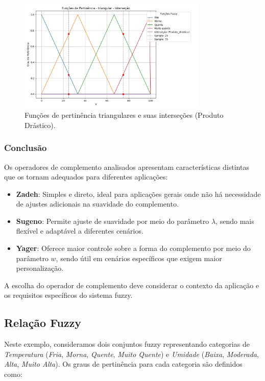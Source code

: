 \documentclass[a4paper,12pt]{article}
\begin{document}
\begin{figure}[H]
    \centering
    \includegraphics[width=0.8\textwidth]{img/funções_de_pertinência_triangular_interseção_fuzzificado.png}
    \caption{Funções de pertinência triangulares e suas interseções (Produto Drástico).}
    \label{fig:intersecao_produto_drastico_triangular}
\end{figure}
\subsubsection{Conclusão}

Os operadores de complemento analisados apresentam características distintas que os tornam adequados para diferentes aplicações:

\begin{itemize}
    \item \textbf{Zadeh}: Simples e direto, ideal para aplicações gerais onde não há necessidade de ajustes adicionais na suavidade do complemento.
    \item \textbf{Sugeno}: Permite ajuste de suavidade por meio do parâmetro $\lambda$, sendo mais flexível e adaptável a diferentes cenários.
    \item \textbf{Yager}: Oferece maior controle sobre a forma do complemento por meio do parâmetro $w$, sendo útil em cenários específicos que exigem maior personalização.
\end{itemize}

A escolha do operador de complemento deve considerar o contexto da aplicação e os requisitos específicos do sistema fuzzy.

\subsection{Relação Fuzzy}

Neste exemplo, consideramos dois conjuntos fuzzy representando categorias de \textit{Temperatura} (\textit{Fria}, \textit{Morna}, \textit{Quente}, \textit{Muito Quente}) e \textit{Umidade} (\textit{Baixa}, \textit{Moderada}, \textit{Alta}, \textit{Muito Alta}). Os graus de pertinência para cada categoria são definidos como:
\end{document}
